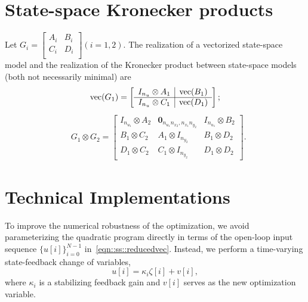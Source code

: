 \section{State-space Kronecker products}\label{appsec::sskron}
Let \(G_i = \left[
    \begin{array}{c|c}
        A_i & B_i\\
        \hline
        C_i & D_i \\
    \end{array}\right] (i=1,2).\)
The realization of a vectorized state-space model and the realization of the Kronecker product between state-space models (both not necessarily minimal) are
\begin{equation*}
\begin{split}
& {\mathrm{vec}}(G_1) = \left[
    \begin{array}{c|c}
        I_{n_u}\otimes A_1 & {\mathrm{vec}}(B_1)\\
        \hline
        I_{n_u}\otimes C_1 & {\mathrm{vec}}(D_1)\\
    \end{array}\right]; \\
\end{split}
\end{equation*}
\begin{equation*}
\begin{split}
& G_1\otimes G_2 = 
\left[
\begin{array}{cc|c}
 I_{n_{u_1}} \otimes A_2  &  \mathbf{0}_{n_{u_1} n_{x_2},n_{x_1} n_{y_2}} & I_{n_{u_1}} \otimes B_2\\
B_1 \otimes C_2 & A_1\otimes I_{n_{y_2}} & B_1 \otimes D_2 \\
\hline
D_1 \otimes C_2 & C_1 \otimes I_{n_{y_2}} & D_1 \otimes D_2 
\end{array}\right].
\end{split}
\end{equation*}

\section{Technical Implementations}\label{appsec:syntech}
To improve the numerical robustness of the optimization, we avoid parameterizing the quadratic program directly in terms of the open-loop input sequence $\{u[i]\}_{i=0}^{N-1}$ in~\eqref{eqn::ss::reducedvec}. Instead, we perform a time-varying state-feedback change of variables,
\[
u[i] = \kappa_i \zeta[i] + v[i],
\]
where $\kappa_i$ is a stabilizing feedback gain and $v[i]$ serves as the new optimization variable.

